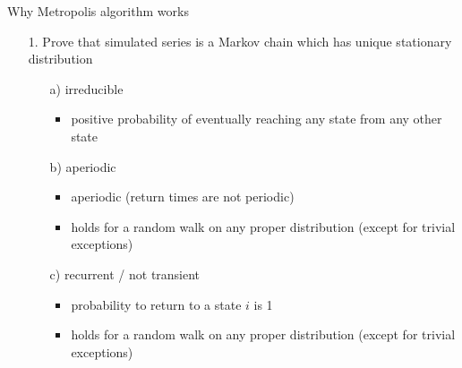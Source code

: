 \documentclass[finnish,english,t]{beamer}
\begin{document}
\begin{frame}{Why Metropolis algorithm works}
  
  \begin{itemize}
  \item[1.] Prove that simulated series is a Markov chain
    which has unique stationary distribution
    \begin{itemize}
    \item[a)] irreducible
      \begin{itemize}
      \item<2->[=] positive probability of eventually reaching any
        state from any other state
      \end{itemize}
    \item[b)] aperiodic
      \begin{itemize}
      \item<3->[=] aperiodic (return times are not periodic)
      \item<3->[-] holds for a random walk on any proper distribution (except for trivial exceptions)
      \end{itemize}
    \item[c)] recurrent / not transient
      \begin{itemize}
      \item<4->[=] probability to return to a state $i$ is 1
      \item<4->[-] holds for a random walk on any proper distribution (except for trivial exceptions)
      \end{itemize}
    \end{itemize}
  \end{itemize}
  
\end{frame}
\end{document}
